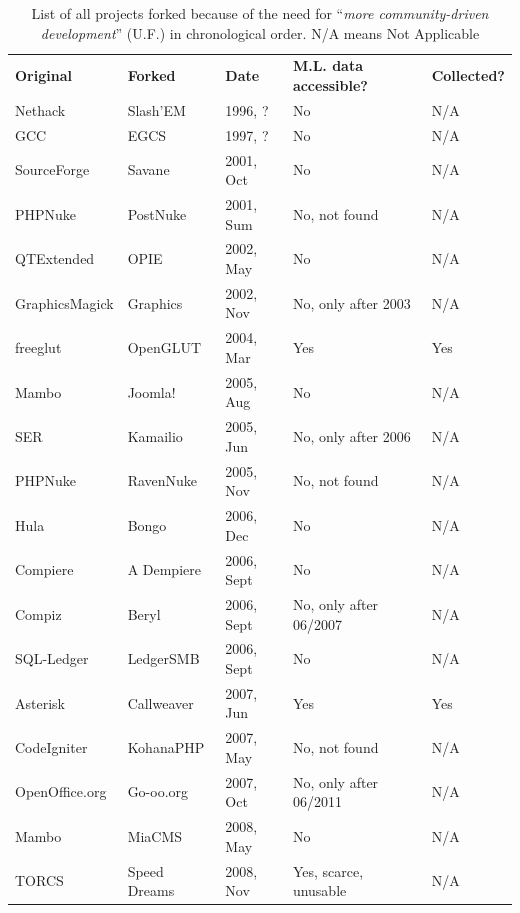 \documentclass[12pt]{report}
\begin{document}
\begin{appendices}
\pagebreak

\begin{table} [H]
\centering
\caption[List of all projects forked because of the need for ``\textit{more community-driven development}'' (U.F.)]{List of all projects forked because of the need for ``\textit{more community-driven development}'' (U.F.) \cite{Robles} in chronological order. N/A means Not Applicable}
\label{tableProjectsForkedCat2CommunityDriven}
\begin{tabular}{m{} m{} m{} m{} m{}}
\hline\noalign{\smallskip}
\textbf{Original} & \textbf{Forked} & \textbf{Date} & \textbf{M.L. data accessible?} & \textbf{Collected?}\\
\noalign{\smallskip}\hline\noalign{\smallskip}
Nethack & Slash'EM & 1996, ? & No & N/A \\ \hline
GCC & EGCS & 1997, ? & No & N/A \\ \hline
SourceForge & Savane & 2001, Oct & No & N/A \\ \hline
PHPNuke & PostNuke & 2001, Sum & No, not found & N/A \\ \hline
QTExtended & OPIE & 2002, May & No & N/A \\ \hline
GraphicsMagick & Graphics & 2002, Nov  & No, only after 2003 & N/A \\ \hline
freeglut & OpenGLUT & 2004, Mar & Yes & Yes \\ \hline
Mambo & Joomla! & 2005, Aug & No & N/A \\ \hline
SER & Kamailio & 2005, Jun & No, only after 2006 & N/A \\ \hline
PHPNuke & RavenNuke & 2005, Nov & No, not found & N/A \\ \hline
Hula & Bongo & 2006, Dec & No & N/A \\ \hline
Compiere & A Dempiere & 2006, Sept & No & N/A \\ \hline
Compiz & Beryl & 2006, Sept & No, only after 06/2007 & N/A \\ \hline
SQL-Ledger & LedgerSMB & 2006, Sept & No & N/A \\ \hline
Asterisk & Callweaver & 2007, Jun & Yes & Yes \\ \hline
CodeIgniter & KohanaPHP & 2007, May & No, not found & N/A \\ \hline
OpenOffice.org & Go-oo.org & 2007, Oct & No, only after 06/2011 & N/A \\ \hline
Mambo & MiaCMS & 2008, May & No & N/A \\ \hline
TORCS & Speed Dreams & 2008, Nov & Yes, scarce, unusable & N/A \\ \hline

\end{tabular}
\end{table}
\end{appendices}
\end{document}
